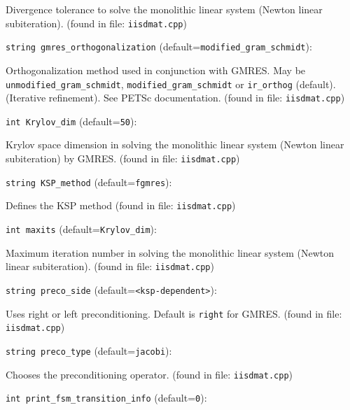 Divergence tolerance to solve the monolithic linear
system (Newton linear subiteration).
 (found in file: \verb+iisdmat.cpp+)
\item\verb+string gmres_orthogonalization+ {\rm(default=\verb|modified_gram_schmidt|)}:

Orthogonalization method used in conjunction with GMRES. 
May be  {\tt unmodified\_gram\_schmidt},
 \verb+modified_gram_schmidt+  or {\tt ir\_orthog} (default). (Iterative refinement).
See PETSc documentation. 
 (found in file: \verb+iisdmat.cpp+)
\item\verb+int Krylov_dim+ {\rm(default=\verb|50|)}:

Krylov space dimension in solving the monolithic linear
system (Newton linear subiteration) by GMRES.
 (found in file: \verb+iisdmat.cpp+)
\item\verb+string KSP_method+ {\rm(default=\verb|fgmres|)}:

Defines the KSP method
 (found in file: \verb+iisdmat.cpp+)
\item\verb+int maxits+ {\rm(default=\verb|Krylov_dim|)}:

Maximum iteration number in solving the monolithic linear
system (Newton linear subiteration).
 (found in file: \verb+iisdmat.cpp+)
\item\verb+string preco_side+ {\rm(default=\verb|<ksp-dependent>|)}:

Uses right or left preconditioning. Default is  \verb+right+  for
GMRES. 
 (found in file: \verb+iisdmat.cpp+)
\item\verb+string preco_type+ {\rm(default=\verb|jacobi|)}:

Chooses the preconditioning operator. 
 (found in file: \verb+iisdmat.cpp+)
\item\verb+int print_fsm_transition_info+ {\rm(default=\verb|0|)}:

